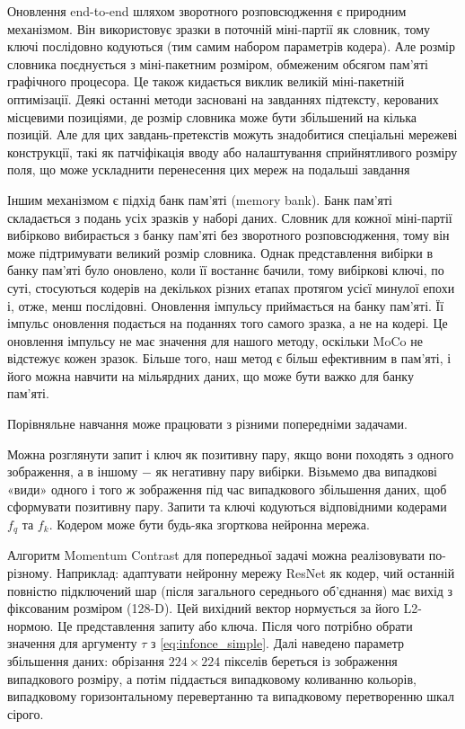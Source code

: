 Оновлення end-to-end шляхом зворотного розповсюдження є природним механізмом. Він використовує зразки в поточній міні-партії як словник, тому ключі послідовно кодуються (тим самим набором параметрів кодера). Але розмір словника поєднується з міні-пакетним розміром, обмеженим обсягом пам'яті графічного процесора. Це також кидається виклик великій міні-пакетній оптимізації. Деякі останні методи засновані на завданнях підтексту, керованих місцевими позиціями, де розмір словника може бути збільшений на кілька позицій. Але для цих завдань-претекстів можуть знадобитися спеціальні мережеві конструкції, такі як патчіфікація вводу або налаштування сприйнятливого розміру поля, що може ускладнити перенесення цих мереж на подальші завдання

Іншим механізмом є підхід банк пам'яті (memory bank). Банк пам'яті складається з подань усіх зразків у наборі даних. Словник для кожної міні-партії вибірково вибирається з банку пам'яті без зворотного розповсюдження, тому він може підтримувати великий розмір словника. Однак представлення вибірки в банку пам'яті було оновлено, коли її востаннє бачили, тому вибіркові ключі, по суті, стосуються кодерів на декількох різних етапах протягом усієї минулої епохи і, отже, менш послідовні. Оновлення імпульсу приймається на банку пам'яті. Її імпульс оновлення подається на поданнях того самого зразка, а не на кодері. Це оновлення імпульсу не має значення для нашого методу, оскільки MoCo не відстежує кожен зразок. Більше того, наш метод є більш ефективним в пам’яті, і його можна навчити на мільярдних даних, що може бути важко для банку пам'яті.

Порівняльне навчання може працювати з різними попередніми задачами.

Можна розглянути запит і ключ як позитивну пару, якщо вони походять з одного зображення, а в іншому $-$ як негативну пару вибірки. Візьмемо два випадкові «види» одного і того ж зображення під час випадкового збільшення даних, щоб сформувати позитивну пару. Запити та ключі кодуються відповідними кодерами $f_{q}$ та $f_{k}$. Кодером може бути будь-яка згорткова нейронна мережа.

Алгоритм Momentum Contrast для попередньої задачі можна реалізовувати по-різному. Наприклад: адаптувати нейронну мережу ResNet як кодер, чий останній повністю підключений шар (після загального середнього об'єднання) має вихід з фіксованим розміром (128-D). Цей вихідний вектор нормується за його L2-нормою. Це представлення запиту або ключа. Після чого потрібно обрати значення для аргументу $\tau$ з \ref{eq:infonce_simple}. Далі наведено параметр збільшення даних: обрізання $224 \times 224$ пікселів береться із зображення випадкового розміру, а потім піддається випадковому коливанню кольорів, випадковому горизонтальному перевертанню та випадковому перетворенню шкал сірого.

